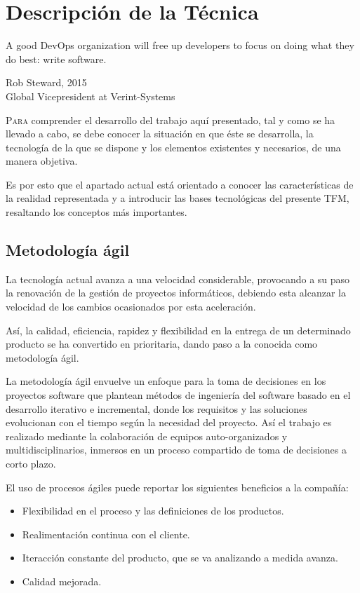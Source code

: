 \chapter{Descripción de la Técnica}\label{chp-02}
\epigraph{A good DevOps organization will free up developers to focus on doing what they do best: write software. }{Rob Steward, 2015\\Global Vicepresident at Verint-Systems}

\lettrine[lraise=-0.1, lines=2, loversize=0.2]{P}{ara} comprender el desarrollo del trabajo aquí presentado, tal y como se ha llevado a cabo, se debe conocer la situación en que éste se desarrolla, la tecnología de la que se dispone y los elementos existentes y necesarios, de una manera objetiva.

Es por esto que el apartado actual está orientado a conocer las características de la realidad representada y a introducir las bases tecnológicas del presente \gls{TFM}, resaltando los conceptos más importantes.

\section{Metodología ágil}

La tecnología actual avanza a una velocidad considerable, provocando a su paso la renovación de la gestión de proyectos informáticos, debiendo esta alcanzar la velocidad de los cambios ocasionados por esta aceleración. 

Así, la calidad, eficiencia, rapidez y flexibilidad en la entrega de un determinado producto se ha convertido en prioritaria, dando paso a la conocida como metodología ágil.

La metodología ágil envuelve un enfoque para la toma de decisiones en los proyectos software que plantean métodos de ingeniería del software basado en el desarrollo iterativo e incremental, donde los requisitos y las soluciones evolucionan con el tiempo según la necesidad del proyecto. Así el trabajo es realizado mediante la colaboración de equipos auto-organizados y multidisciplinarios, inmersos en un proceso compartido de toma de decisiones a corto plazo\cite{vera2014}.

El uso de procesos ágiles puede reportar los siguientes beneficios a la compañía:

\begin{itemize}
	\item Flexibilidad en el proceso y las definiciones de los productos.
	\item Realimentación continua con el cliente.
	\item Iteracción constante del producto, que se va analizando a medida avanza.
	\item Calidad mejorada.
\end{itemize}

